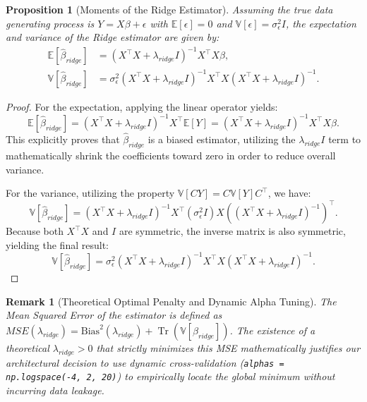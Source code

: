 \documentclass[11pt,a4paper]{article}
\newtheorem{proposition}[theorem]{Proposition}
\newtheorem{remark}[theorem]{Remark}
\begin{document}
\begin{proposition}[Moments of the Ridge Estimator]
Assuming the true data generating process is $Y = X\beta + \epsilon$ with $\mathbb{E}[\epsilon]=0$ and $\mathbb{V}[\epsilon]=\sigma_\epsilon^2 I$, the expectation and variance of the Ridge estimator are given by:
\begin{align*}
\mathbb{E}[\hat{\beta}_{ridge}] &= (X^\top X + \lambda_{ridge} I)^{-1} X^\top X \beta, \\
\mathbb{V}[\hat{\beta}_{ridge}] &= \sigma_\epsilon^2 (X^\top X + \lambda_{ridge} I)^{-1} X^\top X (X^\top X + \lambda_{ridge} I)^{-1}.
\end{align*}
\end{proposition}

\begin{proof}
For the expectation, applying the linear operator yields:
\[ \mathbb{E}[\hat{\beta}_{ridge}] = (X^\top X + \lambda_{ridge} I)^{-1} X^\top \mathbb{E}[Y] = (X^\top X + \lambda_{ridge} I)^{-1} X^\top X \beta. \]
This explicitly proves that $\hat{\beta}_{ridge}$ is a biased estimator, utilizing the $\lambda_{ridge} I$ term to mathematically shrink the coefficients toward zero in order to reduce overall variance.

For the variance, utilizing the property $\mathbb{V}[CY] = C \mathbb{V}[Y] C^\top$, we have:
\[ \mathbb{V}[\hat{\beta}_{ridge}] = (X^\top X + \lambda_{ridge} I)^{-1} X^\top (\sigma_\epsilon^2 I) X \left((X^\top X + \lambda_{ridge} I)^{-1}\right)^\top. \]
Because both $X^\top X$ and $I$ are symmetric, the inverse matrix is also symmetric, yielding the final result:
\[ \mathbb{V}[\hat{\beta}_{ridge}] = \sigma_\epsilon^2 (X^\top X + \lambda_{ridge} I)^{-1} X^\top X (X^\top X + \lambda_{ridge} I)^{-1}. \]
\end{proof}

\begin{remark}[Theoretical Optimal Penalty and Dynamic Alpha Tuning]
The Mean Squared Error of the estimator is defined as $MSE(\lambda_{ridge}) = \text{Bias}^2(\lambda_{ridge}) + \operatorname{Tr}(\mathbb{V}[\hat{\beta}_{ridge}])$. The existence of a theoretical $\lambda_{ridge} > 0$ that strictly minimizes this MSE mathematically justifies our architectural decision to use dynamic cross-validation (\texttt{alphas = np.logspace(-4, 2, 20)}) to empirically locate the global minimum without incurring data leakage.
\end{remark}
\end{document}
